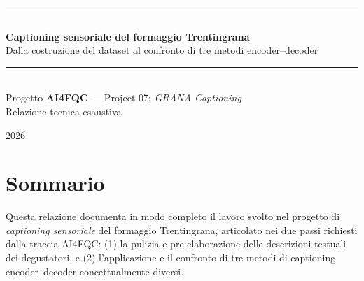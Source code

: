 \documentclass[11pt,a4paper]{article}
\begin{document}
\begin{titlepage}
\centering
\vspace*{1.5cm}
{\color{prim}\rule{\textwidth}{2pt}}\\[0.6cm]
{\Huge\bfseries Captioning sensoriale del formaggio Trentingrana}\\[0.4cm]
{\LARGE Dalla costruzione del dataset al confronto di tre metodi encoder--decoder}\\[0.5cm]
{\color{prim}\rule{\textwidth}{2pt}}\\[1.2cm]

{\large Progetto \textbf{AI4FQC} --- Project 07: \textit{GRANA Captioning}}\\[0.3cm]
{\large Relazione tecnica esaustiva}\\[2.0cm]


\vfill
{\large 2026}\\
\end{titlepage}

\section*{Sommario}
Questa relazione documenta in modo completo il lavoro svolto nel progetto di
\emph{captioning sensoriale} del formaggio Trentingrana, articolato nei due
passi richiesti dalla traccia AI4FQC: (1) la pulizia e pre-elaborazione delle
descrizioni testuali dei degustatori, e (2) l'applicazione e il confronto di
tre metodi di captioning encoder--decoder concettualmente diversi.
\end{document}
